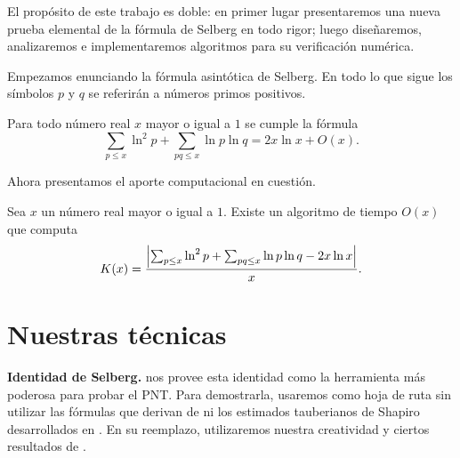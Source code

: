 El prop\'osito de este trabajo es doble:
en primer lugar presentaremos una nueva prueba elemental de la f\'ormula de Selberg en todo rigor;
luego diseñaremos, analizaremos e implementaremos algoritmos
para su verificaci\'on num\'erica.

\bigskip

Empezamos enunciando la f\'ormula asint\'otica de Selberg. 
En todo lo que sigue los s\'imbolos \(p\) y \(q\) se referir\'an a
n\'umeros primos positivos.

\begin{theorem}
  Para todo n\'umero real \(x\) mayor o igual a \(1\)
  se cumple la f\'ormula
  \[
    \sum_{p \leq x} \ln^2 p + \sum_{pq \leq x} \ln p \ln q = 2x\ln x + O(x).
  \]
\end{theorem}

Ahora presentamos el aporte computacional en cuesti\'on.

\begin{theorem}
  Sea \(x\) un n\'umero real mayor o igual a \(1\). Existe un algoritmo de tiempo \(O(x)\) que computa
  \[
    K(x) = \frac{\left\lvert 
      \sum_{p \leq x} \ln^2 p +
      \sum_{pq \leq x} \ln p \ln q -
      2 x \ln x
     \right\rvert}{x}.
  \]
\end{theorem}



\section{Nuestras t\'ecnicas}

\textbf{Identidad de Selberg.}
\cite[secci\'on 2]{Selberg1949} nos provee esta identidad como
la herramienta m\'as poderosa para probar el PNT.
Para demostrarla, usaremos como hoja de ruta \cite{Choudhary2017}
sin utilizar las f\'ormulas que derivan de \cite[teorema 3.17]{Choudhary2017}
ni los estimados tauberianos de Shapiro desarrollados en \cite[secci\'on 4]{Choudhary2017}.
En su reemplazo, utilizaremos nuestra creatividad y
ciertos resultados de \cite{Apostol1976, Diamond1982, TI1951}.

